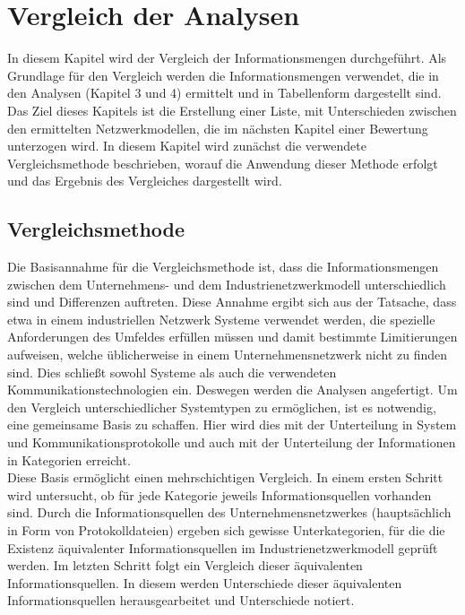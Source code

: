 \chapter{Vergleich der Analysen}
\label{cha:Vergleich der Analysen}

In diesem Kapitel wird der Vergleich der Informationsmengen durchgeführt. Als Grundlage für den Vergleich werden die Informationsmengen verwendet, die in den Analysen (Kapitel 3 und 4) ermittelt und in Tabellenform dargestellt sind. Das Ziel dieses Kapitels ist die Erstellung einer Liste, mit Unterschieden zwischen den ermittelten Netzwerkmodellen, die im nächsten Kapitel einer Bewertung unterzogen wird. In diesem Kapitel wird zunächst die verwendete Vergleichsmethode beschrieben, worauf die Anwendung dieser Methode erfolgt und das Ergebnis des Vergleiches dargestellt wird.

\section{Vergleichsmethode}
Die Basisannahme für die Vergleichsmethode ist, dass die Informationsmengen zwischen dem Unternehmens- und dem Industrienetzwerkmodell unterschiedlich sind und Differenzen auftreten. Diese Annahme ergibt sich aus der Tatsache, dass etwa in einem industriellen Netzwerk Systeme verwendet werden, die spezielle Anforderungen des Umfeldes erfüllen müssen und damit bestimmte Limitierungen aufweisen, welche üblicherweise in einem Unternehmensnetzwerk nicht zu finden sind. Dies schließt sowohl Systeme als auch die verwendeten Kommunikationstechnologien ein.
Deswegen werden die Analysen angefertigt. Um den Vergleich unterschiedlicher Systemtypen zu ermöglichen, ist es notwendig, eine gemeinsame Basis zu schaffen. Hier wird dies mit der Unterteilung in System und Kommunikationsprotokolle und auch mit der Unterteilung der Informationen in Kategorien erreicht. \\ 

Diese Basis ermöglicht einen mehrschichtigen Vergleich. In einem ersten Schritt wird untersucht, ob für jede Kategorie jeweils Informationsquellen vorhanden sind. Durch die Informationsquellen des Unternehmensnetzwerkes (hauptsächlich in Form von Protokolldateien) ergeben sich gewisse Unterkategorien, für die die Existenz äquivalenter Informationsquellen im Industrienetzwerkmodell geprüft werden. Im letzten Schritt folgt ein Vergleich dieser äquivalenten Informationsquellen. In diesem werden Unterschiede dieser äquivalenten Informationsquellen herausgearbeitet und Unterschiede notiert.\\


